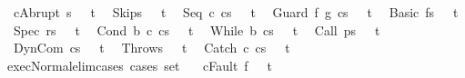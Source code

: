 \begin{isabellebody}
\ \ {\isachardoublequoteopen}{\isasymGamma}{\isasymturnstile}{\isasymlangle}c{\isacharcomma}Abrupt\ s{\isasymrangle}\ {\isasymRightarrow}\ \ t{\isachardoublequoteclose}\isanewline
\ \ {\isachardoublequoteopen}{\isasymGamma}{\isasymturnstile}{\isasymlangle}Skip{\isacharcomma}s{\isasymrangle}\ {\isasymRightarrow}\ \ t{\isachardoublequoteclose}\isanewline
\ \ {\isachardoublequoteopen}{\isasymGamma}{\isasymturnstile}{\isasymlangle}Seq\ c{}\ c{}{\isacharcomma}s{\isasymrangle}\ {\isasymRightarrow}\ \ t{\isachardoublequoteclose}\isanewline
\ \ {\isachardoublequoteopen}{\isasymGamma}{\isasymturnstile}{\isasymlangle}Guard\ f\ g\ c{\isacharcomma}s{\isasymrangle}\ {\isasymRightarrow}\ \ t{\isachardoublequoteclose}\isanewline
\ \ {\isachardoublequoteopen}{\isasymGamma}{\isasymturnstile}{\isasymlangle}Basic\ f{\isacharcomma}s{\isasymrangle}\ {\isasymRightarrow}\ \ t{\isachardoublequoteclose}\isanewline
\ \ {\isachardoublequoteopen}{\isasymGamma}{\isasymturnstile}{\isasymlangle}Spec\ r{\isacharcomma}s{\isasymrangle}\ {\isasymRightarrow}\ \ t{\isachardoublequoteclose}\isanewline
\ \ {\isachardoublequoteopen}{\isasymGamma}{\isasymturnstile}{\isasymlangle}Cond\ b\ c{}\ c{}{\isacharcomma}s{\isasymrangle}\ {\isasymRightarrow}\ \ t{\isachardoublequoteclose}\isanewline
\ \ {\isachardoublequoteopen}{\isasymGamma}{\isasymturnstile}{\isasymlangle}While\ b\ c{\isacharcomma}s{\isasymrangle}\ {\isasymRightarrow}\ \ t{\isachardoublequoteclose}\isanewline
\ \ {\isachardoublequoteopen}{\isasymGamma}{\isasymturnstile}{\isasymlangle}Call\ p{\isacharcomma}s{\isasymrangle}\ {\isasymRightarrow}\ \ t{\isachardoublequoteclose}\isanewline
\ \ {\isachardoublequoteopen}{\isasymGamma}{\isasymturnstile}{\isasymlangle}DynCom\ c{\isacharcomma}s{\isasymrangle}\ {\isasymRightarrow}\ \ t{\isachardoublequoteclose}\isanewline
\ \ {\isachardoublequoteopen}{\isasymGamma}{\isasymturnstile}{\isasymlangle}Throw{\isacharcomma}s{\isasymrangle}\ {\isasymRightarrow}\ \ t{\isachardoublequoteclose}\isanewline
\ \ {\isachardoublequoteopen}{\isasymGamma}{\isasymturnstile}{\isasymlangle}Catch\ c{}\ c{}{\isacharcomma}s{\isasymrangle}\ {\isasymRightarrow}\ \ t{\isachardoublequoteclose}\isanewline
\isanewline
\isanewline
{}\isamarkupfalse%
\ exec{\isacharunderscore}Normal{\isacharunderscore}elim{\isacharunderscore}cases\ {\isacharbrackleft}cases\ set{\isacharbrackright}{\isacharcolon}\ \isanewline
\ \ {\isachardoublequoteopen}{\isasymGamma}{\isasymturnstile}{\isasymlangle}c{\isacharcomma}Fault\ f{\isasymrangle}\ {\isasymRightarrow}\ \ t{\isachardoublequoteclose}\isanewline

\end{isabellebody}
